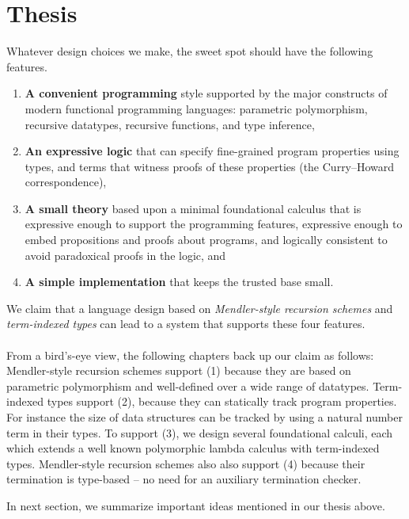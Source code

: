 \section{Thesis}\label{sec:intro:thesis}
Whatever design choices we make, the sweet spot should have the following features.

\begin{enumerate}[(1)]
 \item \textbf{A convenient programming} style
         supported by the major constructs of
         modern functional programming languages: 
         parametric polymorphism, recursive datatypes,
         recursive functions, and type inference,
 \item \textbf{An expressive logic}
         that can specify fine-grained program properties using types, and terms that
         witness proofs of these properties 
         (the Curry--Howard correspondence),
 \item \textbf{A small theory} based upon a minimal foundational calculus that is
         expressive enough to support the programming features, expressive
         enough to embed propositions and proofs about
         programs, and logically consistent
         to avoid paradoxical proofs in the logic, and
 \item \textbf{A simple implementation} that keeps the trusted base small.
\end{enumerate}
We claim that a language design based on \emph{Mendler-style recursion schemes}
and \emph{term-indexed types} can lead to a system that supports these four
features.

\paragraph{}
From a bird's-eye view, the following chapters back up our claim as follows:
Mendler-style recursion schemes support (1) because they are based on
parametric polymorphism and well-defined over a wide range of datatypes.
Term-indexed types support (2), because they can statically track program
properties. For instance the size of data structures can be tracked by using
a natural number term in their types.
To support (3), we design several foundational calculi, each which extends
a well known polymorphic lambda calculus with term-indexed types.
Mendler-style recursion schemes also also support (4) because their
termination is type-based -- no need for an auxiliary termination checker.

In next section, we summarize important ideas mentioned in our thesis above.

